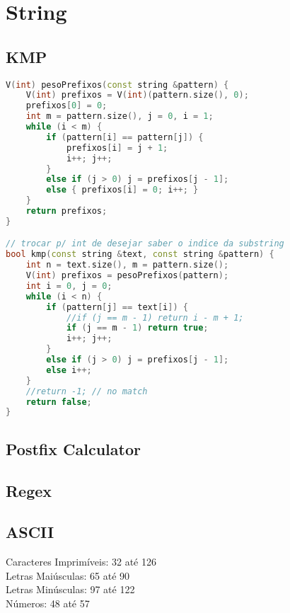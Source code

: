 \chapter{String}




\section{KMP}
\begin{lstlisting}[language=C++]
V(int) pesoPrefixos(const string &pattern) {
    V(int) prefixos = V(int)(pattern.size(), 0);
    prefixos[0] = 0;
    int m = pattern.size(), j = 0, i = 1;
    while (i < m) {
        if (pattern[i] == pattern[j]) {
            prefixos[i] = j + 1;
            i++; j++;
        }
        else if (j > 0) j = prefixos[j - 1];
        else { prefixos[i] = 0; i++; }
    }
    return prefixos;
}

// trocar p/ int de desejar saber o indice da substring
bool kmp(const string &text, const string &pattern) {
    int n = text.size(), m = pattern.size();
    V(int) prefixos = pesoPrefixos(pattern);
    int i = 0, j = 0;
    while (i < n) {
        if (pattern[j] == text[i]) {
            //if (j == m - 1) return i - m + 1;
            if (j == m - 1) return true;
            i++; j++;
        }
        else if (j > 0) j = prefixos[j - 1];
        else i++;
    }
    //return -1; // no match
    return false;
}
\end{lstlisting}


\section{Postfix Calculator}
\section{Regex}
\section{ASCII}
Caracteres Imprimíveis: 32 até 126\\
Letras Maiúsculas: 65 até 90\\
Letras Minúsculas: 97 até 122\\
Números: 48 até 57\\